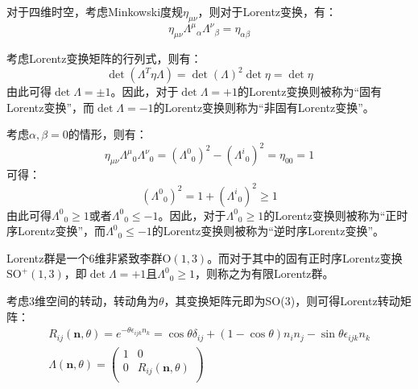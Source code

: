 对于四维时空，考虑Minkowski度规$\eta_{\mu\nu}$，则对于Lorentz变换，有：
\begin{equation}
	\eta_{\mu\nu}{\Lambda^\mu}_\alpha {\Lambda^\nu}_\beta=\eta_{\alpha\beta}
\end{equation}
\par 考虑Lorentz变换矩阵的行列式，则有：
\begin{equation}
	\det(\Lambda^T\eta\Lambda)=\det(\Lambda)^2\det\eta=\det\eta
\end{equation}
由此可得$\det\Lambda=\pm1$。因此，对于$\det\Lambda=+1$的Lorentz变换则被称为“固有Lorentz变换”，而$\det\Lambda=-1$的Lorentz变换则称为“非固有Lorentz变换”。
\par 考虑$\alpha, \beta=0$的情形，则有：
\begin{equation}
	\eta_{\mu\nu}{\Lambda^\mu}_0{\Lambda^\nu}_0=({\Lambda^0}_0)^2-({\Lambda^i}_0)^2=\eta_{00}=1
\end{equation}
可得：
\begin{equation}
	({\Lambda^0}_0)^2=1+({\Lambda^i}_0)^2\geqslant1
\end{equation}
由此可得${\Lambda^0}_0\geqslant1$或者${\Lambda^0}_0\leqslant-1$。因此，对于${\Lambda^0}_0\geqslant1$的Lorentz变换则被称为“正时序Lorentz变换”，而${\Lambda^0}_0\leqslant-1$的Lorentz变换则被称为“逆时序Lorentz变换”。

Lorentz群是一个6维非紧致李群$\mathrm{O}(1,3)$。而对于其中的固有正时序Lorentz变换$\mathrm{SO}^+(1,3)$，即$\det\Lambda=+1$且${\Lambda^0}_0\geqslant1$，则称之为有限Lorentz群。

考虑3维空间的转动，转动角为$\theta$，其变换矩阵元即为SO(3)，则可得Lorentz转动矩阵：
\begin{gather}
	R_{ij}(\boldsymbol{n},\theta)=e^{-\theta\epsilon_{ijk}n_k}=\cos\theta\delta_{ij}+(1-\cos\theta)n_{i}n_{j}-\sin\theta\epsilon_{ijk}n_k\\
	\Lambda(\boldsymbol{n},\theta)=\begin{pmatrix}
		1&	0\\
		0&	R_{ij}(\boldsymbol{n},\theta)\\
	\end{pmatrix}
\end{gather}

